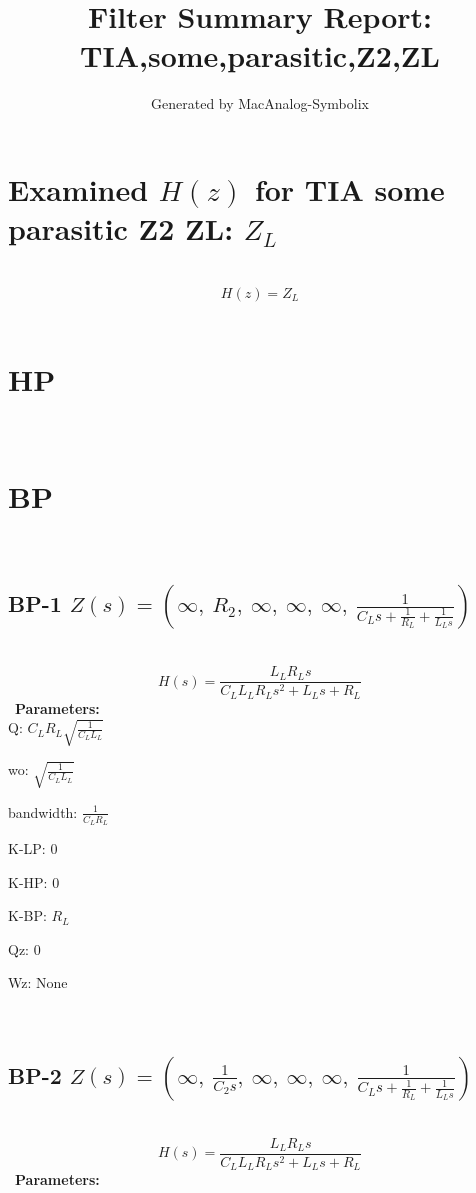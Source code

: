 \documentclass{article}
\begin{document}
        
                        \title{Filter Summary Report: TIA,some,parasitic,Z2,ZL}
                        \author{Generated by MacAnalog-Symbolix}
                        \maketitle

                        \tableofcontents
                        \newpage
                        \section{Examined $H(z)$ for TIA some parasitic Z2 ZL: $Z_{L}$ }\ 
\textbf{\[H(z) = Z_{L}\] }\ 
\section{HP}\ 
\section{BP}\ 
\subsection{BP-1 $Z(s) = \left( \infty, \  R_{2}, \  \infty, \  \infty, \  \infty, \  \frac{1}{C_{L} s + \frac{1}{R_{L}} + \frac{1}{L_{L} s}}\right)$ } \ 
\textbf{\[H(s) = \frac{L_{L} R_{L} s}{C_{L} L_{L} R_{L} s^{2} + L_{L} s + R_{L}}\] } \ 
\textbf{Parameters:}\\ 

Q: $C_{L} R_{L} \sqrt{\frac{1}{C_{L} L_{L}}}$\ 

wo: $\sqrt{\frac{1}{C_{L} L_{L}}}$\ 

bandwidth: $\frac{1}{C_{L} R_{L}}$\ 

K-LP: $0$\ 

K-HP: $0$\ 

K-BP: $R_{L}$\ 

Qz: $0$\ 

Wz: $\text{None}$\ 

\ 

\subsection{BP-2 $Z(s) = \left( \infty, \  \frac{1}{C_{2} s}, \  \infty, \  \infty, \  \infty, \  \frac{1}{C_{L} s + \frac{1}{R_{L}} + \frac{1}{L_{L} s}}\right)$ } \ 
\textbf{\[H(s) = \frac{L_{L} R_{L} s}{C_{L} L_{L} R_{L} s^{2} + L_{L} s + R_{L}}\] } \ 
\textbf{Parameters:}\\ 
\end{document}
